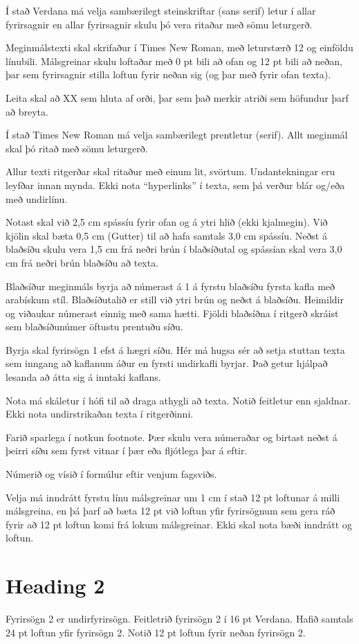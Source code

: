 \documentclass[a4paper,12pt,twoside,BCOR=10mm]{scrbook}
\begin{document}
Í stað Verdana má velja sambærilegt steinskriftar (sans serif) letur í allar fyrirsagnir en allar fyrirsagnir skulu þó vera ritaðar með sömu leturgerð.

Meginmálstexti skal skrifaður í Times New Roman, með leturstærð 12 og einföldu línubili. Málsgreinar skulu loftaðar með 0 pt bili að ofan og 12 pt bili að neðan, þar sem fyrirsagnir stilla loftun fyrir neðan sig (og þar með fyrir ofan texta).

Leita skal að XX sem hluta af orði, þar sem það merkir atriði sem höfundur þarf að breyta.

Í stað Times New Roman má velja sambærilegt prentletur (serif). Allt meginmál skal þó ritað með sömu leturgerð. 

Allur texti ritgerðar skal ritaður með einum lit, svörtum. Undantekningar eru leyfðar innan mynda. Ekki nota “hyperlinks” í texta, sem þá verður blár og/eða með undirlínu.

Notast skal við 2,5 cm spássíu fyrir ofan og á ytri hlið (ekki kjalmegin). Við kjölin skal bæta 0,5 cm (Gutter) til að hafa samtals 3,0 cm spássíu. Neðst á blaðsíðu skulu vera 1,5 cm frá neðri brún í blaðsíðutal og spássían skal vera 3,0 cm frá neðri brún blaðsíðu að texta.

Blaðsíður meginmáls byrja að númerast á 1 á fyrstu blaðsíðu fyrsta kafla með arabískum stíl. Blaðsíðutalið er still við ytri brún og neðst á blaðsíðu. Heimildir og viðaukar númerast einnig með sama hætti. Fjöldi blaðsíðna í ritgerð skráist sem blaðsíðunúmer öftustu prentuðu síðu.

Byrja skal fyrirsögn 1 efst á hægri síðu. Hér má hugsa sér að setja stuttan texta sem inngang að kaflanum áður en fyrsti undirkafli byrjar. Það getur hjálpað lesanda að átta sig á inntaki kaflans.

Nota má skáletur í hófi til að draga athygli að texta. Notið feitletur enn sjaldnar. Ekki nota undirstrikaðan texta í ritgerðinni.

Farið sparlega í notkun footnote. Þær skulu vera númeraðar og birtast neðst á þeirri síðu sem fyrst vitnar í þær eða fljótlega þar á eftir.

Númerið og vísið í formúlur eftir venjum fagsviðs.

Velja má inndrátt fyrstu línu málsgreinar um 1 cm í stað 12 pt loftunar á milli málsgreina, en þá þarf að bæta 12 pt við loftun yfir fyrirsögnum sem gera ráð fyrir að 12 pt loftun komi frá lokum málsgreinar. Ekki skal nota bæði inndrátt og loftun.

\section{Heading 2}
Fyrirsögn 2 er undirfyrirsögn. Feitletrið fyrirsögn 2 í 16 pt Verdana. Hafið samtals 24 pt loftun yfir fyrirsögn 2. Notið 12 pt loftun fyrir neðan fyrirsögn 2.
\end{document}

